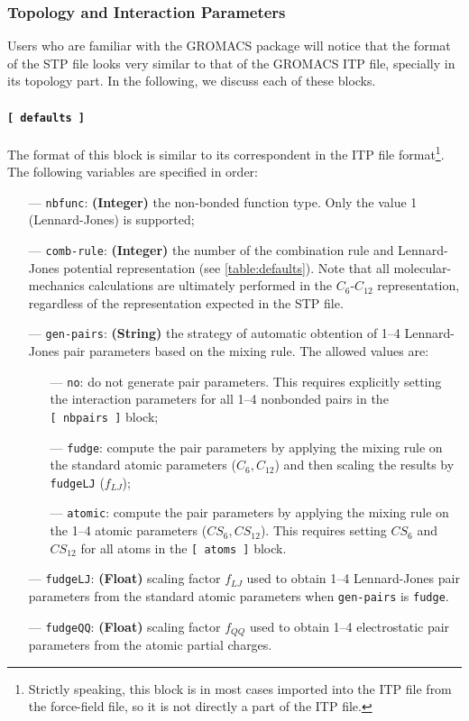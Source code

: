 \documentclass[10pt,a4paper,openany]{memoir}
\numberwithin{equation}{section}
\begin{document}
\subsubsection{Topology and Interaction Parameters}
\label{sec:stp-topology}

Users who are familiar with the GROMACS package will notice that the
format of the STP file looks very similar to that of the GROMACS ITP
file, specially in its topology part. In the following, we discuss
each of these blocks.

\paragraph{\texttt{[~defaults~]}}

The format of this block is similar to its correspondent in the ITP file format\footnote{Strictly speaking, this block is in most cases imported into the ITP file from the force-field file, so it is not directly a part of the ITP file.}.
The following variables are specified in order:
\begin{itemize}
\item [---] \texttt{nbfunc}: \textbf{(Integer)} the non-bonded function type. Only the value 1 (Lennard-Jones) is supported;
\item [---] \texttt{comb-rule}: \textbf{(Integer)} the number of the combination rule and Lennard-Jones potential representation (see \autoref{table:defaults}).
  Note that all molecular-mechanics calculations are ultimately performed in the $C_6$-$C_{12}$ representation, regardless of the representation expected in the STP file.
\item [---] \texttt{gen-pairs}: \textbf{(String)} the strategy of automatic obtention of  1--4 Lennard-Jones pair parameters based on the mixing rule. The allowed values are:
  \begin{itemize}
  \item [---] \texttt{no}: do not generate pair parameters. This requires explicitly setting the interaction parameters for all 1--4 nonbonded pairs in the \texttt{[~nbpairs~]} block;
  \item [---] \texttt{fudge}: compute the pair parameters by applying the mixing rule on the standard atomic parameters ($C_6,C_{12}$) and then scaling the results by \texttt{fudgeLJ} ($f_{LJ}$);
  \item [---] \texttt{atomic}: compute the pair parameters by applying the mixing rule on the 1--4 atomic parameters ($CS_6,CS_{12}$). This requires setting $CS_6$ and $CS_{12}$ for all atoms in the \texttt{[~atoms~]} block.
  \end{itemize}
\item [---] \texttt{fudgeLJ}: \textbf{(Float)} scaling factor $f_{LJ}$ used to obtain 1--4 Lennard-Jones pair parameters from the standard atomic parameters when \texttt{gen-pairs} is \texttt{fudge}.
\item [---] \texttt{fudgeQQ}: \textbf{(Float)} scaling factor $f_{QQ}$ used to obtain 1--4 electrostatic pair parameters from the atomic partial charges.
\end{itemize}
\end{document}
